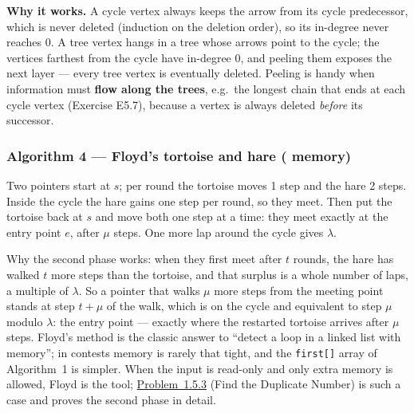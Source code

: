 \textbf{Why it works.} A cycle vertex always keeps the arrow from its cycle predecessor, which is never deleted (induction on the deletion order), so its in-degree never reaches 0. A tree vertex hangs in a tree whose arrows point to the cycle; the vertices farthest from the cycle have in-degree 0, and peeling them exposes the next layer --- every tree vertex is eventually deleted. Peeling is handy when information must \textbf{flow along the trees}, e.g.\ the longest chain that ends at each cycle vertex (Exercise E5.7), because a vertex is always deleted \emph{before} its successor.

\subsubsection*{Algorithm 4 --- Floyd's tortoise and hare ( memory)}

Two pointers start at $s$; per round the tortoise moves 1 step and the hare 2 steps. Inside the cycle the hare gains one step per round, so they meet. Then put the tortoise back at $s$ and move both one step at a time: they meet exactly at the entry point $e$, after $\mu$ steps. One more lap around the cycle gives $\lambda$.

\begin{diagrambox}
\end{diagrambox}

Why the second phase works: when they first meet after $t$ rounds, the hare has walked $t$ more steps than the tortoise, and that surplus is a whole number of laps, a multiple of $\lambda$. So a pointer that walks $\mu$ more steps from the meeting point stands at step $t + \mu$ of the walk, which is on the cycle and equivalent to step $\mu$ modulo $\lambda$: the entry point --- exactly where the restarted tortoise arrives after $\mu$ steps. Floyd's method is the classic answer to ``detect a loop in a linked list with  memory''; in contests memory is rarely that tight, and the \texttt{first[]} array of Algorithm~1 is simpler. When the input is read-only and only  extra memory is allowed, Floyd is the tool; \hyperref[ssec:ch1-find-duplicate]{Problem~1.5.3} (Find the Duplicate Number) is such a case and proves the second phase in detail.

